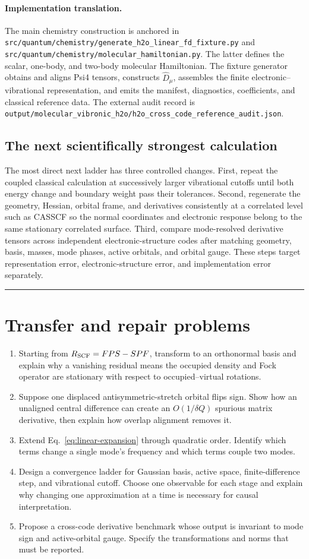 \documentclass[10pt,twocolumn]{article}
\newcommand{\conceptbreak}{%
  \par\medskip\noindent
  {\color{black!30}\rule{\columnwidth}{0.35pt}}%
  \par\medskip}
\newcommand{\impl}{\paragraph{Implementation translation.}}
\newcommand{\codepath}[1]{\nolinkurl{#1}}
\begin{document}
\impl The main chemistry construction is anchored in
\codepath{src/quantum/chemistry/generate_h2o_linear_fd_fixture.py} and
\codepath{src/quantum/chemistry/molecular_hamiltonian.py}.  The latter defines
the scalar, one-body, and two-body molecular Hamiltonian.  The fixture
generator obtains and aligns Psi4 tensors, constructs $\hat D_\mu$, assembles
the finite electronic--vibrational representation, and emits the manifest,
diagnostics, coefficients, and classical reference data.  The external audit record is
\codepath{output/molecular_vibronic_h2o/h2o_cross_code_reference_audit.json}.

\subsection*{The next scientifically strongest calculation}

The most direct next ladder has three controlled changes.  First, repeat the
coupled classical calculation at successively larger vibrational cutoffs until
both energy change and boundary weight pass their tolerances.  Second,
regenerate the geometry, Hessian, orbital frame, and derivatives consistently
at a correlated level such as CASSCF so the normal coordinates and electronic
response belong to the same stationary correlated surface.  Third, compare
mode-resolved derivative tensors across independent electronic-structure codes
after matching geometry, basis, masses, mode phases, active orbitals, and
orbital gauge.  These steps target representation error, electronic-structure
error, and implementation error separately.

\conceptbreak

\section*{Transfer and repair problems}

\begin{enumerate}[leftmargin=1.35em,itemsep=3pt]
\item Starting from $R_{\rm SCF}=FPS-SPF$, transform to an orthonormal basis
and explain why a vanishing residual means the occupied density and Fock
operator are stationary with respect to occupied--virtual rotations.
\item Suppose one displaced antisymmetric-stretch orbital flips sign.  Show
how an unaligned central difference can create an $O(1/\delta Q)$ spurious
matrix derivative, then explain how overlap alignment removes it.
\item Extend Eq.~\eqref{eq:linear-expansion} through quadratic order.  Identify
which terms change a single mode's frequency and which terms couple two modes.
\item Design a convergence ladder for Gaussian basis, active space,
finite-difference step, and vibrational cutoff.  Choose one observable for each
stage and explain why changing one approximation at a time is necessary for
causal interpretation.
\item Propose a cross-code derivative benchmark whose output is invariant to
mode sign and active-orbital gauge.  Specify the transformations and norms that
must be reported.
\end{enumerate}
\end{document}
